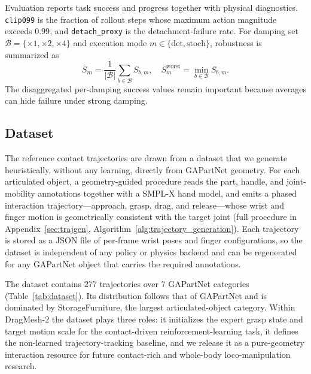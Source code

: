 \documentclass{llmxive}
\begin{document}
Evaluation reports task success and progress together with physical
diagnostics. \texttt{clip099} is the fraction of rollout steps whose
maximum action magnitude exceeds $0.99$, and
\texttt{detach\_proxy} is the detachment-failure rate. For damping
set $\mathcal{B}=\{\times1,\times2,\times4\}$ and execution mode
$m\in\{\mathrm{det},\mathrm{stoch}\}$, robustness is summarized as
\begin{equation}
\bar S_m=\frac{1}{|\mathcal{B}|}\sum_{b\in\mathcal{B}}S_{b,m},
\quad
S^{\mathrm{worst}}_m=\min_{b\in\mathcal{B}}S_{b,m}.
\label{eq:robust_main}
\end{equation}
The disaggregated per-damping success values remain important
because averages can hide failure under strong damping.


\subsection{Dataset}
\label{sec:dataset}

The reference contact trajectories are drawn from a dataset that we
generate heuristically, without any learning, directly from GAPartNet
geometry. For each articulated object, a geometry-guided procedure
reads the part, handle, and joint-mobility annotations together with a
SMPL-X hand model, and emits a phased interaction
trajectory---approach, grasp, drag, and release---whose wrist and
finger motion is geometrically consistent with the target joint (full
procedure in Appendix~\ref{sec:trajgen}, Algorithm~\ref{alg:trajectory_generation}).
Each trajectory is stored as a JSON file of per-frame wrist poses and
finger configurations, so the dataset is independent of any policy or
physics backend and can be regenerated for any GAPartNet object that
carries the required annotations.

The dataset contains $277$ trajectories over $7$ GAPartNet categories
(Table~\ref{tab:dataset}). Its distribution follows that of GAPartNet
and is dominated by StorageFurniture, the largest articulated-object
category. Within DragMesh-2 the dataset plays three roles: it
initializes the expert grasp state and target motion scale for the
contact-driven reinforcement-learning task, it defines the non-learned
trajectory-tracking baseline, and we release it as a pure-geometry
interaction resource for future contact-rich and whole-body
loco-manipulation research.
\end{document}
